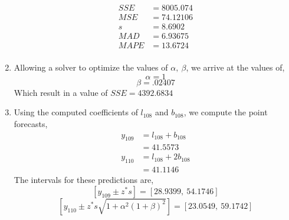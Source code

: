 \documentclass[letterpaper,10pt]{article}
\begin{document}
\begin{enumerate}
\begin{align*}
SSE &= 8005.074 \\
MSE &= 74.12106\\
s &= 8.6902\\
MAD &= 6.93675\\
MAPE &= 13.6724\\
\end{align*}
\item Allowing a solver to optimize the values of $\alpha,\ \beta$, we arrive at the values of,
\[\alpha=1\]
\[\beta=.02407\]
Which result in a value of $SSE=4392.6834$
\item Using the computed coefficients of $l_{108}$ and $b_{108}$, we compute the point forecasts,
\begin{align*}
y_{109} &= l_{108}+b_{108}\\
&=41.5573\\
y_{110} &= l_{108}+2b_{108}\\
&=41.1146
\end{align*}
The intervals for these predictions are,
\[[y_{109}\pm z^*s]=[28.9399,\ 54.1746]\]
\[[y_{110}\pm z^*s\sqrt{1+\alpha^2(1+\beta)^2}]=[23.0549,\ 59.1742]\]
\end{enumerate}
\end{document}
